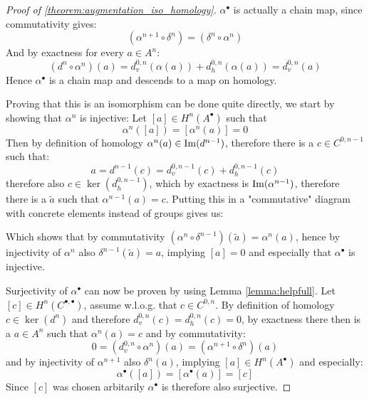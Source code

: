 \begin{proof}[Proof of \ref{theorem:augmentation_iso_homology}]
$\alpha^\bullet$ is actually a chain map, since commutativity gives:
\[
	(\alpha^{n + 1} \circ \delta^n)
		= (\delta^n \circ \alpha^n)
\]
And by exactness for every $a \in A^n$:
\[
	(d^n \circ \alpha^n)(a) = d^{0,n}_v(\alpha(a)) + d^{0,n}_h(\alpha(a)) = d^{0,n}_v(a)
\]
Hence $\alpha^\bullet$ is a chain map and descends to a map on homology.

Proving that this is an isomorphism can be done quite directly, we start by
showing that $\alpha^n$ is injective: Let $[a] \in H^n(A^\bullet)$ such that
\[
	\alpha^n([a])
		= [\alpha^n(a)]
		= 0
\]
Then by definition of homology $\alpha^n(a) \in \operatorname{Im}(d^{n - 1})$,
therefore there is a $c \in C^{0, n - 1}$ such that:
\[
	a = d^{n - 1}(c) = d^{0, n - 1}_v(c) + d^{0, n - 1}_h(c)
\]
therefore also $c \in \ker(d^{0, n - 1}_h)$, which by exactness is
$\operatorname{Im}(\alpha^{n - 1})$, therefore there is a $\tilde{a}$ such that
$\alpha^{n - 1}(a) = c$. Putting this in a "commutative" diagram with
concrete elements instead of groups gives us:
\begin{center}
\end{center}
Which shows that by commutativity
$(\alpha^n \circ \delta^{n - 1})(\tilde{a}) = \alpha^n(a)$, hence by
injectivity of $\alpha^n$ also $\delta^{n - 1}(\tilde{a}) = a$, 
implying $[a] = 0$ and especially that $\alpha^\bullet$ is injective.

Surjectivity of $\alpha^\bullet$ can now be proven by using Lemma
\ref{lemma:helpfull}. Let $[c] \in H^n(C^{\bullet, \bullet})$,
assume w.l.o.g. that $c \in C^{0,n}$. By definition of homology
$c \in \ker(d^n)$ and therefore $d^{0,n}_v(c) = d^{0,n}_h(c) = 0$, by exactness
there then is a $a \in A^n$ such that $\alpha^n(a) = c$ and by commutativity:
\[
	0 = (d^{0,n}_v \circ \alpha^n)(a) = (\alpha^{n + 1} \circ \delta^n)(a)
\]
and by injectivity of $\alpha^{n + 1}$ also $\delta^n(a)$, implying
$[a] \in H^n(A^\bullet)$ and especially:
\[
	\alpha^\bullet([a]) = [\alpha^\bullet(a)] = [c]
\]
Since $[c]$ was chosen arbitarily $\alpha^\bullet$ is therefore also
surjective.
\end{proof}

